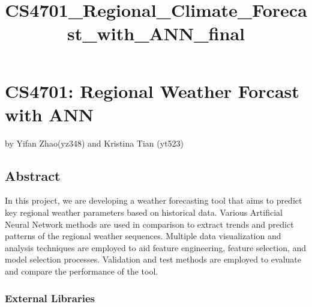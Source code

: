 \documentclass[11pt]{article}
\title{CS4701\_Regional\_Climate\_Forecast\_with\_ANN\_final}
\begin{document}
    
    
    \maketitle
    
    

    
    \section{CS4701: Regional Weather Forcast with
ANN}\label{cs4701-regional-weather-forcast-with-ann}

by Yifan Zhao(yz348) and Kristina Tian (yt523)

    \subsection{Abstract}\label{abstract}

    In this project, we are developing a weather forecasting tool that aims
to predict key regional weather parameters based on historical data.
Various Artificial Neural Network methods are used in comparison to
extract trends and predict patterns of the regional weather sequences.
Multiple data visualization and analysis techniques are employed to aid
feature engineering, feature selection, and model selection processes.
Validation and test methods are employed to evaluate and compare the
performance of the tool.

    \subsubsection{External Libraries}\label{external-libraries}
\end{document}
